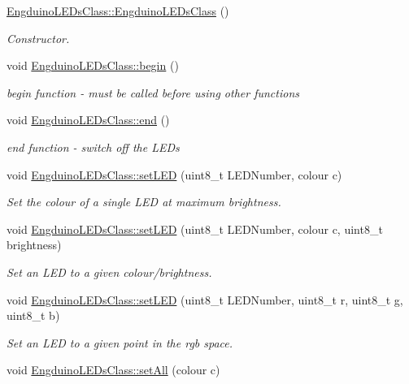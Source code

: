 \begin{DoxyCompactItemize}
\item 
\hyperlink{group___engduino_l_e_ds_ga37cd3409485caa6cd8712e9d70c95171}{Engduino\+L\+E\+Ds\+Class\+::\+Engduino\+L\+E\+Ds\+Class} ()
\begin{DoxyCompactList}\small\item\em Constructor. \end{DoxyCompactList}\item 
void \hyperlink{group___engduino_l_e_ds_ga288fdb1044c2685bd16f2ab7ea793e9f}{Engduino\+L\+E\+Ds\+Class\+::begin} ()
\begin{DoxyCompactList}\small\item\em begin function -\/ must be called before using other functions \end{DoxyCompactList}\item 
void \hyperlink{group___engduino_l_e_ds_ga07e877de81c2a7016ab65564f2e0b2df}{Engduino\+L\+E\+Ds\+Class\+::end} ()
\begin{DoxyCompactList}\small\item\em end function -\/ switch off the L\+E\+Ds \end{DoxyCompactList}\item 
void \hyperlink{group___engduino_l_e_ds_ga02934e20c403fc14d563fbf09d3a3b68}{Engduino\+L\+E\+Ds\+Class\+::set\+L\+E\+D} (uint8\+\_\+t L\+E\+D\+Number, colour c)
\begin{DoxyCompactList}\small\item\em Set the colour of a single L\+E\+D at maximum brightness. \end{DoxyCompactList}\item 
void \hyperlink{group___engduino_l_e_ds_gab354e5a76be82762e0a5c0f96abd75a6}{Engduino\+L\+E\+Ds\+Class\+::set\+L\+E\+D} (uint8\+\_\+t L\+E\+D\+Number, colour c, uint8\+\_\+t brightness)
\begin{DoxyCompactList}\small\item\em Set an L\+E\+D to a given colour/brightness. \end{DoxyCompactList}\item 
void \hyperlink{group___engduino_l_e_ds_ga1c7421a4eed2e09aeda98da4a4b29483}{Engduino\+L\+E\+Ds\+Class\+::set\+L\+E\+D} (uint8\+\_\+t L\+E\+D\+Number, uint8\+\_\+t r, uint8\+\_\+t g, uint8\+\_\+t b)
\begin{DoxyCompactList}\small\item\em Set an L\+E\+D to a given point in the rgb space. \end{DoxyCompactList}\item 
void \hyperlink{group___engduino_l_e_ds_ga50aaa6fe93206e0fa0f037b4a7be3284}{Engduino\+L\+E\+Ds\+Class\+::set\+All} (colour c)

\end{DoxyCompactItemize}
